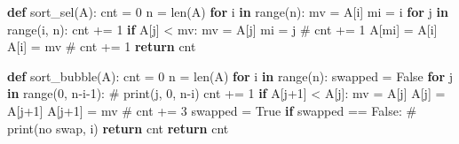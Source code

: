 \documentclass[
  letterpaper,
  DIV=11,
  numbers=noendperiod]{scrreprt}
\newenvironment{Shaded}{\begin{snugshade}}{\end{snugshade}}
\newcommand{\BuiltInTok}[1]{\textcolor[rgb]{0.00,0.23,0.31}{#1}}
\newcommand{\CommentTok}[1]{\textcolor[rgb]{0.37,0.37,0.37}{#1}}
\newcommand{\ControlFlowTok}[1]{\textcolor[rgb]{0.00,0.23,0.31}{\textbf{#1}}}
\newcommand{\DecValTok}[1]{\textcolor[rgb]{0.68,0.00,0.00}{#1}}
\newcommand{\KeywordTok}[1]{\textcolor[rgb]{0.00,0.23,0.31}{\textbf{#1}}}
\newcommand{\NormalTok}[1]{\textcolor[rgb]{0.00,0.23,0.31}{#1}}
\newcommand{\OperatorTok}[1]{\textcolor[rgb]{0.37,0.37,0.37}{#1}}
\newcommand{\VariableTok}[1]{\textcolor[rgb]{0.07,0.07,0.07}{#1}}
\begin{document}
\begin{Shaded}
\begin{Highlighting}[]
\KeywordTok{def}\NormalTok{ sort\_sel(A):}
\NormalTok{    cnt }\OperatorTok{=} \DecValTok{0}
\NormalTok{    n }\OperatorTok{=} \BuiltInTok{len}\NormalTok{(A)}
    \ControlFlowTok{for}\NormalTok{ i }\KeywordTok{in} \BuiltInTok{range}\NormalTok{(n):}
\NormalTok{        mv }\OperatorTok{=}\NormalTok{ A[i]}
\NormalTok{        mi }\OperatorTok{=}\NormalTok{ i}
        \ControlFlowTok{for}\NormalTok{ j }\KeywordTok{in} \BuiltInTok{range}\NormalTok{(i, n):}
\NormalTok{            cnt }\OperatorTok{+=} \DecValTok{1}
            \ControlFlowTok{if}\NormalTok{ A[j] }\OperatorTok{\textless{}}\NormalTok{ mv:}
\NormalTok{                mv }\OperatorTok{=}\NormalTok{ A[j]}
\NormalTok{                mi }\OperatorTok{=}\NormalTok{ j}
\CommentTok{\#                 cnt += 1}
\NormalTok{        A[mi] }\OperatorTok{=}\NormalTok{ A[i]}
\NormalTok{        A[i] }\OperatorTok{=}\NormalTok{ mv}
\CommentTok{\#         cnt += 1}
    \ControlFlowTok{return}\NormalTok{ cnt}

\KeywordTok{def}\NormalTok{ sort\_bubble(A):}
\NormalTok{    cnt }\OperatorTok{=} \DecValTok{0}
\NormalTok{    n }\OperatorTok{=} \BuiltInTok{len}\NormalTok{(A)}
    \ControlFlowTok{for}\NormalTok{ i }\KeywordTok{in} \BuiltInTok{range}\NormalTok{(n):}
\NormalTok{        swapped }\OperatorTok{=} \VariableTok{False}
        \ControlFlowTok{for}\NormalTok{ j }\KeywordTok{in} \BuiltInTok{range}\NormalTok{(}\DecValTok{0}\NormalTok{, n}\OperatorTok{{-}}\NormalTok{i}\OperatorTok{{-}}\DecValTok{1}\NormalTok{):}
\CommentTok{\#             print(j, 0, n{-}i)}
\NormalTok{            cnt }\OperatorTok{+=} \DecValTok{1}
            \ControlFlowTok{if}\NormalTok{ A[j}\OperatorTok{+}\DecValTok{1}\NormalTok{] }\OperatorTok{\textless{}}\NormalTok{ A[j]:}
\NormalTok{                mv }\OperatorTok{=}\NormalTok{ A[j]}
\NormalTok{                A[j] }\OperatorTok{=}\NormalTok{ A[j}\OperatorTok{+}\DecValTok{1}\NormalTok{]}
\NormalTok{                A[j}\OperatorTok{+}\DecValTok{1}\NormalTok{] }\OperatorTok{=}\NormalTok{ mv}
\CommentTok{\#                 cnt += 3}
\NormalTok{                swapped }\OperatorTok{=} \VariableTok{True}
        \ControlFlowTok{if}\NormalTok{ swapped }\OperatorTok{==} \VariableTok{False}\NormalTok{:}
\CommentTok{\#             print(\textquotesingle{}no swap\textquotesingle{}, i)}
            \ControlFlowTok{return}\NormalTok{ cnt}
    \ControlFlowTok{return}\NormalTok{ cnt}
\end{Highlighting}
\end{Shaded}
\end{document}
